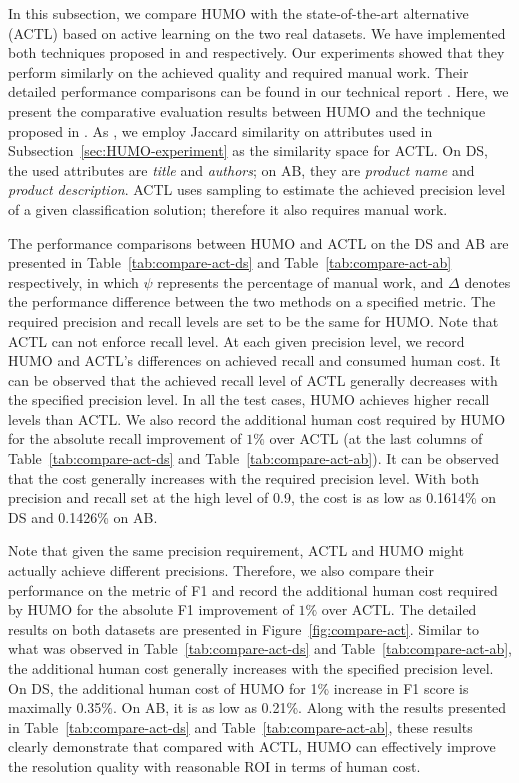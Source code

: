  In this subsection, we compare HUMO with the state-of-the-art alternative (ACTL) based on active learning on the two real datasets. We have implemented both techniques proposed in \cite{arasu2010active} and \cite{bellare2012active} respectively. Our experiments showed that they perform similarly on the achieved quality and required manual work. Their detailed performance comparisons can be found in our technical report \cite{chen2017humoreport}. Here, we present the comparative evaluation results between HUMO and the technique proposed in \cite{arasu2010active}. As \cite{arasu2010active}, we employ Jaccard similarity on attributes used in Subsection~\ref{sec:HUMO-experiment} as the similarity space for ACTL. On DS, the used attributes are {\em title} and {\em authors}; on AB, they are {\em product name} and {\em product description}. ACTL uses sampling to estimate the achieved precision level of a given classification solution; therefore it also requires manual work.


 The performance comparisons between HUMO and ACTL on the DS and AB are presented in Table~\ref{tab:compare-act-ds} and Table~\ref{tab:compare-act-ab} respectively, in which $\psi$ represents the percentage of manual work, and $\Delta$ denotes the performance difference between the two methods on a specified metric. The required precision and recall levels are set to be the same for HUMO. Note that ACTL can not enforce recall level. At each given precision level, we record HUMO and ACTL's differences on achieved recall and consumed human cost. It can be observed that the achieved recall level of ACTL generally decreases with the specified precision level. In all the test cases, HUMO achieves higher recall levels than ACTL. We also record the additional human cost required by HUMO for the absolute recall improvement of $1\%$ over ACTL (at the last columns of Table~\ref{tab:compare-act-ds} and Table~\ref{tab:compare-act-ab}). It can be observed that the cost generally increases with the required precision level. With both precision and recall set at the high level of 0.9, the cost is as low as 0.1614\% on DS and 0.1426\% on AB.

  Note that given the same precision requirement, ACTL and HUMO might actually achieve different precisions. Therefore, we also compare their performance on the metric of F1 and record the additional human cost required by HUMO for the absolute F1 improvement of $1\%$ over ACTL. The detailed results on both datasets are presented in Figure~\ref{fig:compare-act}. Similar to what was observed in Table~\ref{tab:compare-act-ds} and Table~\ref{tab:compare-act-ab}, the additional human cost generally increases with the specified precision level. On DS, the additional human cost of HUMO for 1\% increase in F1 score is maximally 0.35\%. On AB, it is as low as 0.21\%.
Along with the results presented in Table~\ref{tab:compare-act-ds} and Table~\ref{tab:compare-act-ab}, these results clearly demonstrate that compared with ACTL, HUMO can effectively improve the resolution quality with reasonable ROI in terms of human cost.

